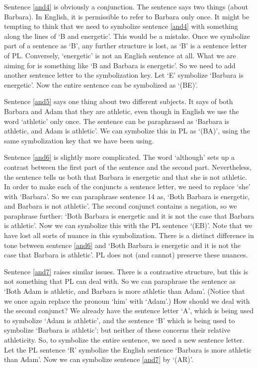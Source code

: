 Sentence \ref{and4} is obviously a conjunction. The sentence says two things (about Barbara). In English, it is permissible to refer to Barbara only once. It might be tempting to think that we need to symbolize sentence \ref{and4} with something along the lines of ‘B and energetic’. This would be a mistake. Once we symbolize part of a sentence as ‘B’, any further structure is lost, as ‘B’ is a sentence letter of PL. Conversely, ‘energetic’ is not an English sentence at all. What we are aiming for is something like ‘B and Barbara is energetic’. So we need to add another sentence letter to the symbolization key. Let ‘E’ symbolize ‘Barbara is energetic’. Now the entire sentence can be symbolized as ‘(B\eand E)’.

Sentence \ref{and5} says one thing about two different subjects. It says of both Barbara and Adam that they are athletic, even though in English we use the word ‘athletic’ only once. The sentence can be paraphrased as ‘Barbara is athletic, and Adam is athletic’. We can symbolize this in PL as ‘(B\eand A)’, using the same symbolization key that we have been using.

Sentence \ref{and6} is slightly more complicated. The word ‘although’ sets up a contrast between the first part of the sentence and the second part. Nevertheless, the sentence tells us both that Barbara is energetic and that she is not athletic. In order to make each of the conjuncts a sentence letter, we need to replace ‘she’ with ‘Barbara’. So we can paraphrase sentence 14 as, ‘Both Barbara is energetic, and Barbara is not athletic’. The second conjunct contains a negation, so we paraphrase further: ‘Both Barbara is energetic and it is not the case that Barbara is athletic’. Now we can symbolize this with the PL sentence ‘(E\eand \enot B)’. Note that we have lost all sorts of nuance in this symbolization. There is a distinct difference in tone between sentence \ref{and6} and ‘Both Barbara is energetic and it is not the case that Barbara is athletic’. PL does not (and cannot) preserve these nuances.

Sentence \ref{and7} raises similar issues. There is a contrastive structure, but this is not something that PL can deal with. So we can paraphrase the sentence as ‘Both Adam is athletic, and Barbara is more athletic than Adam’. (Notice that we once again replace the pronoun ‘him’ with ‘Adam’.) How should we deal with the second conjunct? We already have the sentence letter ‘A’, which is being used to symbolize ‘Adam is athletic’, and the sentence ‘B’ which is being used to symbolize ‘Barbara is athletic’; but neither of these concerns their relative athleticity. So, to symbolize the entire sentence, we need a new sentence letter. Let the PL sentence ‘R’ symbolize the English sentence ‘Barbara is more athletic than Adam’. Now we can symbolize sentence  \ref{and7} by ‘(A\eand R)’.

